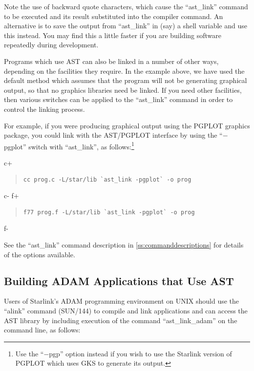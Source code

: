 \documentclass[twoside,11pt]{article}
\newcommand{\xref}[3]{#1}
\newcommand{\appref}[1]{Appendix~\ref{#1}}
\renewcommand{\appref}[1]{\ref{#1}}
\begin{document}
Note the use of backward quote characters, which cause the
``ast\_link'' command to be executed and its result substituted into
the compiler command. An alternative is to save the output from
``ast\_link'' in (say) a shell variable and use this instead. You may
find this a little faster if you are building software repeatedly
during development.

Programs which use AST can also be linked in a number of other ways,
depending on the facilities they require. In the example above, we
have used the default method which assumes that the program will not
be generating graphical output, so that no graphics libraries need be
linked. If you need other facilities, then various switches can be
applied to the ``ast\_link'' command in order to control the linking
process.

For example, if you were producing graphical output using the PGPLOT
graphics package, you could link with the AST/PGPLOT interface by
using the ``$-$pgplot'' switch with ``ast\_link'', as
follows:\footnote{Use the ``$-$pgp'' option instead if you wish to use
the Starlink version of PGPLOT which uses GKS to generate its output.}

c+
\begin{quote}
\small
\begin{verbatim}
cc prog.c -L/star/lib `ast_link -pgplot` -o prog
\end{verbatim}
\normalsize
\end{quote}
c-
f+
\begin{quote}
\small
\begin{verbatim}
f77 prog.f -L/star/lib `ast_link -pgplot` -o prog
\end{verbatim}
\normalsize
\end{quote}
f-

See the ``ast\_link'' command description in
\appref{ss:commanddescriptions} for details of the options available.

\subsection{Building ADAM Applications that Use AST}

Users of Starlink's \xref{ADAM}{sg4}{} programming environment
 on UNIX should use the
``\xref{alink}{sun144}{ADAM_link_scripts}'' command
(\xref{SUN/144}{sun144}{}) to compile and link applications and can
access the AST library by including execution of the command
``ast\_link\_adam'' on the command line, as follows:
\end{document}
